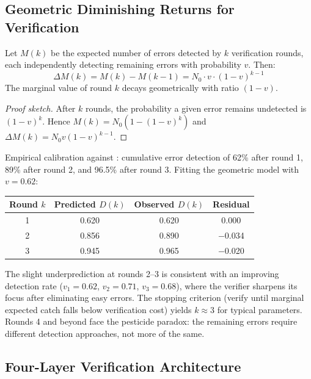 \subsection{Geometric Diminishing Returns for Verification}

\begin{theorem}
\label{thm:diminishing-returns}
Let $M(k)$ be the expected number of errors detected by $k$ verification rounds, each independently detecting remaining errors with probability $v$. Then:
\begin{equation}
    \Delta M(k) = M(k) - M(k-1) = N_0 \cdot v \cdot (1-v)^{k-1}
\end{equation}
The marginal value of round $k$ decays geometrically with ratio $(1-v)$.
\end{theorem}

\begin{proof}[Proof sketch]
After $k$ rounds, the probability a given error remains undetected is $(1-v)^k$. Hence $M(k) = N_0(1 - (1-v)^k)$ and $\Delta M(k) = N_0 v (1-v)^{k-1}$.
\end{proof}

Empirical calibration against \citet{hariharan2025plan}: cumulative error detection of 62\% after round 1, 89\% after round 2, and 96.5\% after round 3. Fitting the geometric model with $v = 0.62$:

\begin{center}
\small
\begin{tabular}{cccc}
\toprule
Round $k$ & Predicted $D(k)$ & Observed $D(k)$ & Residual \\
\midrule
1 & 0.620 & 0.620 & 0.000 \\
2 & 0.856 & 0.890 & $-$0.034 \\
3 & 0.945 & 0.965 & $-$0.020 \\
\bottomrule
\end{tabular}
\end{center}

The slight underprediction at rounds 2--3 is consistent with an improving detection rate ($v_1 = 0.62$, $v_2 = 0.71$, $v_3 = 0.68$), where the verifier sharpens its focus after eliminating easy errors. The stopping criterion (verify until marginal expected catch falls below verification cost) yields $k \approx 3$ for typical parameters. Rounds 4 and beyond face the pesticide paradox: the remaining errors require different detection approaches, not more of the same.

\subsection{Four-Layer Verification Architecture}

